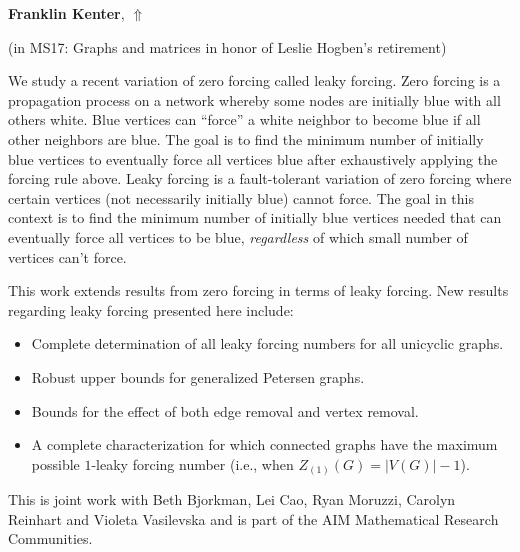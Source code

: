 \documentclass[ILAS2025-program.tex]{subfiles}
\begin{document}
\hypertarget{down0378}{}\begin{ilasabstract}
    
\textbf{Franklin Kenter},  \hfill \hyperlink{up0378}{$\Uparrow$}
    
    
(in {\color{mstitle}MS17: Graphs and matrices in honor of Leslie Hogben's retirement})
        
\mtskip
    We study a recent variation of zero forcing called leaky forcing.  Zero forcing is a propagation process on a network whereby some nodes are initially blue with all others white. Blue vertices can ``force'' a white neighbor to become blue if all other  neighbors are blue. The goal is to find the minimum number of initially blue vertices to eventually force all vertices blue after exhaustively applying the forcing rule above.
Leaky forcing is a fault-tolerant variation of zero forcing where certain vertices (not necessarily initially blue) cannot force. The goal in this context is to find the minimum number of initially blue vertices needed that can eventually force all vertices to be blue, {\it regardless} of which small number of vertices can't force.

This work extends results from zero forcing in terms of leaky forcing. New results regarding leaky forcing presented here include:
\begin{itemize}
\item Complete determination of all leaky forcing numbers for all unicyclic graphs.
\item Robust upper bounds for generalized Petersen graphs.
\item Bounds for the effect of both edge removal and vertex removal.
\item A complete characterization for which connected graphs have the maximum possible $1$-leaky forcing number (i.e., when $Z_{(1)}(G) = |V(G)|-1$).
\end{itemize}

This is joint work with 
Beth Bjorkman, Lei Cao, Ryan Moruzzi, Carolyn Reinhart and Violeta Vasilevska and is part of the AIM Mathematical Research Communities. 

\end{ilasabstract}
    
\end{document}
